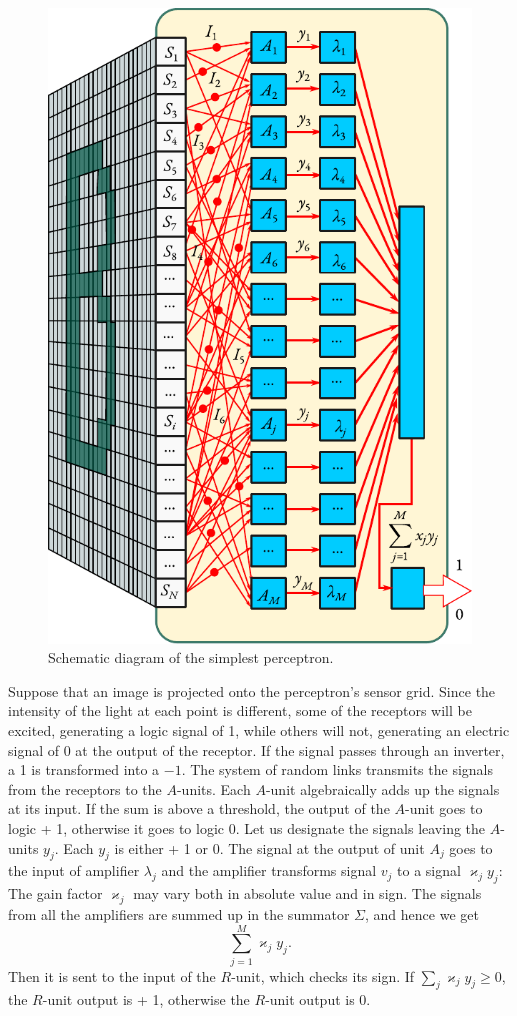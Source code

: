 \begin{figure}[ht]
 \centering
 \includegraphics[width=.68\linewidth]{figures/perceptron2.pdf}
\caption{Schematic diagram of the simplest perceptron.\label{perceptron2}}
 \end{figure}
 
Suppose that an image is projected onto the perceptron's sensor grid.
Since the intensity of the light at each point is different, some of the
receptors will be excited, generating a logic signal of 1, while others will
not, generating an electric signal of 0 at the output of the receptor. If the
signal passes through an inverter, a 1 is transformed into a $-1$. The
system of random links transmits the signals from the receptors to the
$A$-units. Each $A$-unit algebraically adds up the signals at its input. If the
sum is above a threshold, the output of the $A$-unit goes to logic + 1,
otherwise it goes to logic 0. Let us designate the signals leaving the
$A$-units $y_{j}$. Each $y_{j}$ is either + 1 or 0. The signal at the output of unit $A_{j}$ goes to the input of amplifier $\lambda_{j}$ and the amplifier transforms signal $v_{j}$ to a signal $\varkappa_{j} y_{j}$: The gain factor $\varkappa_{j}$ may vary both in absolute value and in sign. The signals from all the amplifiers are summed up in the summator $\Sigma$, and hence we get 
\begin{equation*}%
\sum_{j= 1}^{M} \varkappa_{j} y_{j}.
\end{equation*}
Then it is sent to the input of the $R$-unit, which checks its sign. If
$\sum_{j} \varkappa_{j} y_{j} \geqslant 0$, the $R$-unit output is + 1, otherwise the $R$-unit output is 0.

